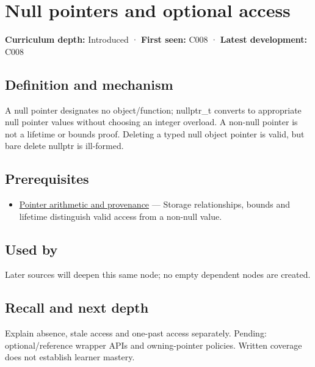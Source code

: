 \hypertarget{appendix-afae48c31800}{}\label{referencestart:appendix-afae48c31800}
\section{Null pointers and optional access}\label{appendix-afae48c31800-null-pointers-and-optional-access}

\textbf{Curriculum depth:} Introduced · \textbf{First seen:} C008 · \textbf{Latest development:} C008

\subsection{Definition and mechanism}\label{appendix-afae48c31800-definition-and-mechanism}

A null pointer designates no object/function; nullptr\_t converts to appropriate null pointer values without choosing an integer overload. A non-null pointer is not a lifetime or bounds proof. Deleting a typed null object pointer is valid, but bare delete nullptr is ill-formed.

\subsection{Prerequisites}\label{appendix-afae48c31800-prerequisites}

\begin{itemize}
\tightlist
\item
  \hyperref[appendix-6af5921bc853]{Pointer arithmetic and provenance} --- Storage relationships, bounds and lifetime distinguish valid access from a non-null value.
\end{itemize}

\subsection{Used by}\label{appendix-afae48c31800-used-by}

Later sources will deepen this same node; no empty dependent nodes are created.

\subsection{Recall and next depth}\label{appendix-afae48c31800-recall-and-next-depth}

Explain absence, stale access and one-past access separately. Pending: optional/reference wrapper APIs and owning-pointer policies. Written coverage does not establish learner mastery.

